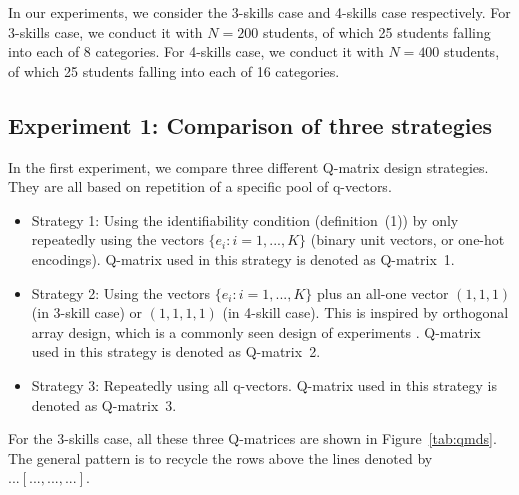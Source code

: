 \documentclass{edm_template}
\begin{document}
In our experiments, we consider the 3-skills case and 4-skills case respectively. For 3-skills case, we conduct it with $N=200$ students, of which 25 students falling into each of 8 categories. For 4-skills case, we conduct it with $N=400$ students, of which 25 students falling into each of 16 categories. 

\subsection{Experiment 1: Comparison of three strategies}

In the first experiment, we compare three different Q-matrix design strategies. They are all based on repetition of a specific pool of q-vectors.
\begin{itemize}
\item Strategy 1: Using the identifiability condition (definition~(1)) by only repeatedly using the vectors $\{e_{i}:i=1,...,K\}$ (binary unit vectors, or one-hot encodings). Q-matrix used in this strategy is denoted as Q-matrix~1.
\item Strategy 2: Using the vectors $\{e_{i}:i=1,...,K\}$ plus an all-one vector $(1,1,1)$ (in 3-skill case) or $(1,1,1,1)$ (in 4-skill case). This is inspired by orthogonal array design, which is a commonly seen design of experiments \cite{montgomery2017design}. Q-matrix used in this strategy is denoted as Q-matrix~2.
\item Strategy 3: Repeatedly using all q-vectors. Q-matrix used in this strategy is denoted as Q-matrix~3.
\end{itemize}
For the 3-skills case, all these three Q-matrices are shown in Figure~\ref{tab:qmds}. The general pattern is to recycle the rows above the lines denoted by~$... [..., ..., ...]$.
\end{document}
